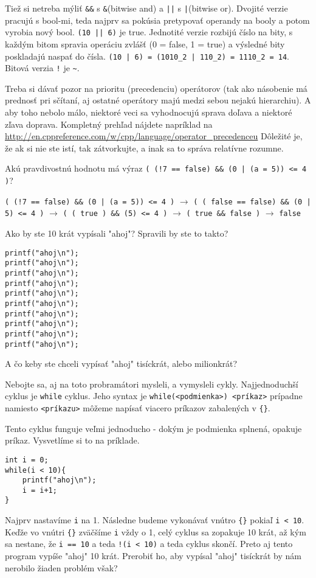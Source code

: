 Tiež si netreba mýliť \verb!&&! s \verb!&!(bitwise and) a \verb!||! s
\verb!|!(bitwise or). Dvojité verzie pracujú s bool-mi, teda najprv sa pokúsia
pretypovať operandy na booly a potom vyrobia nový bool. \verb!(10 || 6)! je true.
Jednotité verzie rozbijú číslo na bity, s každým bitom spravia operáciu zvlášť
(0 = false, 1 = true) a výsledné bity poskladajú naspať do čísla. 
\verb!(10 | 6) = (1010_2 | 110_2) = 1110_2 = 14!.  Bitová verzia \verb'!' je \verb'~'.

Treba si dávať pozor na prioritu (precedenciu) operátorov (tak ako násobenie má
prednosť pri sčítaní, aj ostatné operátory majú medzi sebou nejakú hierarchiu).
A aby toho nebolo málo, niektoré veci sa vyhodnocujú sprava doľava a niektoré
zľava doprava. Kompletný prehľad nájdete napríklad na
\url{http://en.cppreference.com/w/cpp/language/operator\_precedenceu} Dôležité
je, že ak si nie ste istí, tak zátvorkujte, a inak sa to správa relatívne
rozumne.

\cvicenie Akú pravdivostnú hodnotu má výraz 
\verb'( (!7 == false) && (0 | (a = 5)) <= 4 )'?

\riesenie \verb'( (!7 == false) && (0 | (a = 5)) <= 4 )' $\rightarrow$
\verb'( ( false == false) && (0 | 5) <= 4 )' $\rightarrow$
\verb'( ( true ) && (5) <= 4 )' $\rightarrow$ \verb'( true && false )' $\rightarrow$ \verb'false'


Ako by ste 10 krát vypísali "ahoj"? Spravili by ste to takto?
\begin{lstlisting}
printf("ahoj\n");
printf("ahoj\n");
printf("ahoj\n");
printf("ahoj\n");
printf("ahoj\n");
printf("ahoj\n");
printf("ahoj\n");
printf("ahoj\n");
printf("ahoj\n");
printf("ahoj\n");
\end{lstlisting}
A čo keby ste chceli vypísať "ahoj" tisíckrát, alebo milionkrát?

Nebojte sa, aj na toto probramátori mysleli, a vymysleli cykly.  Najjednoduchší
cyklus je \verb!while! cyklus. Jeho syntax je 
\verb!while(<podmienka>) <príkaz>! prípadne namiesto \verb!<príkazu>! 
môžeme napísať viacero príkazov zabalených v \verb!{}!.

Tento cyklus funguje veľmi jednoducho - dokým je podmienka splnená, opakuje
príkaz. Vysvetlíme si to na príklade.
\begin{lstlisting}
int i = 0;
while(i < 10){
    printf("ahoj\n");
    i = i+1;
}
\end{lstlisting}
Najprv nastavíme \verb!i! na 1. Následne budeme vykonávať vnútro \verb!{}! pokiaľ 
\verb!i < 10!. Keďže vo vnútri \verb!{}! zväčšíme \verb!i! vždy o 1, celý cyklus sa zopakuje
10 krát, až kým sa nestane, že \verb!i == 10! a teda \verb'!(i < 10)' a teda cyklus
skončí.  Preto aj tento program vypíše "ahoj" 10 krát. Prerobiť ho, aby vypísal
"ahoj" tisíckrát by nám nerobilo žiaden problém však?

